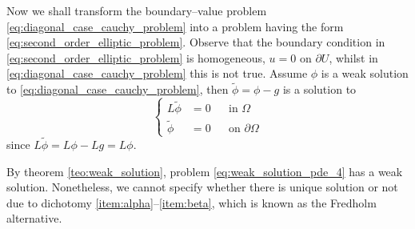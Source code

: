 Now we shall transform the boundary--value problem
\eqref{eq:diagonal_case_cauchy_problem} into a problem having the form
\eqref{eq:second_order_elliptic_problem}. Observe that the boundary condition in
\eqref{eq:second_order_elliptic_problem} is homogeneous, \ie $u = 0$ on
$\partial U$, whilst in \eqref{eq:diagonal_case_cauchy_problem} this is not
true. Assume $\phi$ is a weak solution to
\eqref{eq:diagonal_case_cauchy_problem}, then $\tilde{\phi} = \phi - g$ is a solution to
\begin{equation} \label{eq:weak_solution_pde_4}
	\left\{
		\begin{aligned}
			L \tilde{\phi} &= 0 & &\text{in } \Omega \\
			\tilde{\phi} &= 0 	& &\text{on } \partial \Omega 
		\end{aligned}
	\right.
\end{equation}
since $L \tilde{\phi} = L \phi - L g = L \phi$.

\begin{remark}
	
\end{remark}

By theorem \ref{teo:weak_solution}, problem \eqref{eq:weak_solution_pde_4} has a
weak solution. Nonetheless, we cannot specify whether there is unique solution
or not due to dichotomy \ref{item:alpha}--\ref{item:beta}, which is known as the
Fredholm alternative.
